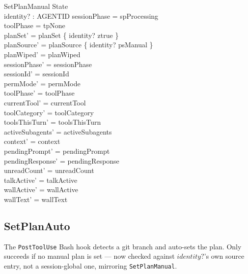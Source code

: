 \documentclass[a4paper,10pt,fleqn]{article}
\begin{document}
\begin{schema}{SetPlanManual}
  \Delta State \\
  identity? : AGENTID
  \where
  sessionPhase = spProcessing \\
  toolPhase = tpNone \\
  planSet' = planSet \oplus \{ identity? \mapsto ztrue \} \\
  planSource' = planSource \oplus \{ identity? \mapsto psManual \} \\
  planWiped' = planWiped \\
  sessionPhase' = sessionPhase \\
  sessionId' = sessionId \\
  permMode' = permMode \\
  toolPhase' = toolPhase \\
  currentTool' = currentTool \\
  toolCategory' = toolCategory \\
  toolsThisTurn' = toolsThisTurn \\
  activeSubagents' = activeSubagents \\
  context' = context \\
  pendingPrompt' = pendingPrompt \\
  pendingResponse' = pendingResponse \\
  unreadCount' = unreadCount \\
  talkActive' = talkActive \\
  wallActive' = wallActive \\
  wallText' = wallText
\end{schema}

\subsection{SetPlanAuto}

The \texttt{PostToolUse} Bash hook detects a git branch and
auto-sets the plan. Only succeeds if no manual plan is set ---
now checked against $identity?$'s own source entry, not a
session-global one, mirroring \texttt{SetPlanManual}.
\end{document}

